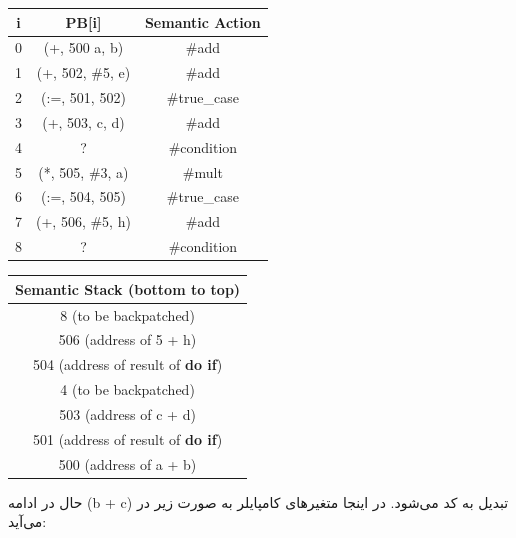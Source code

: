 \documentclass[]{article}
\begin{document}
\begin{latin}
\centering
\begin{tabular}{|c|c|c|}
    \hline
    i & PB[i] & Semantic Action\\
    \hline
    0 & (+, 500 a, b) & \#add\\
    1 & (+, 502, \#5, e) & \#add\\
    2 & (:=, 501, 502) & \#true\_case\\
    3 & (+, 503, c, d) & \#add\\
    4 & ? & \#condition\\
    5 & (*, 505, \#3, a) & \#mult\\
    6 & (:=, 504, 505) & \#true\_case\\
    7 & (+, 506, \#5, h) & \#add\\
    8 & ? & \#condition\\
    \hline
\end{tabular}
\begin{tabular}{|c|}
    \hline
    Semantic Stack (bottom to top)\\
    \hline
    8 (to be backpatched)\\
    \hline
    506 (address of 5 + h)\\
    \hline
    504 (address of result of \textbf{do if})\\
    \hline
    4 (to be backpatched)\\
    \hline
    503 (address of c + d)\\
    \hline
    501 (address of result of \textbf{do if})\\
    \hline
    500 (address of a + b)\\
    \hline
\end{tabular}
\end{latin}
حال در ادامه
\lr(b + c)
تبدیل به کد می‌شود. در اینجا متغیر‌های کامپایلر به صورت زیر در می‌آید:
\end{document}

